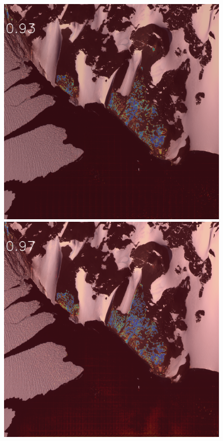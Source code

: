 \begin{figure}[h]
\includegraphics[width=\subFigx]{./fig/datagrow/MSE_single_unet_train_0_1.txt_bias-1_bs128_do0.1e25/WV02_20110131195115_1030010009CCF900_11JAN31195115-M1BS-052549143040_01_P003_u08rf3031.png}
\includegraphics[width=\subFigx]{./fig/datagrow/MSE_single_unet_train_0_2.txt_bias-1_bs128_do0.1e25/WV02_20110131195115_1030010009CCF900_11JAN31195115-M1BS-052549143040_01_P003_u08rf3031.png}

\end{figure}
